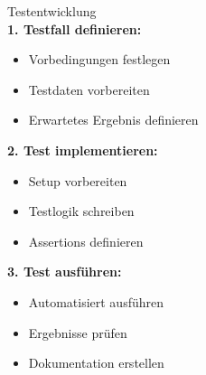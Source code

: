 \begin{KR}{Testentwicklung}\\
\textbf{1. Testfall definieren:}
\begin{itemize}
    \item Vorbedingungen festlegen
    \item Testdaten vorbereiten
    \item Erwartetes Ergebnis definieren
\end{itemize}

\textbf{2. Test implementieren:}
\begin{itemize}
    \item Setup vorbereiten
    \item Testlogik schreiben
    \item Assertions definieren
\end{itemize}

\textbf{3. Test ausführen:}
\begin{itemize}
    \item Automatisiert ausführen
    \item Ergebnisse prüfen
    \item Dokumentation erstellen
\end{itemize}
\end{KR}

